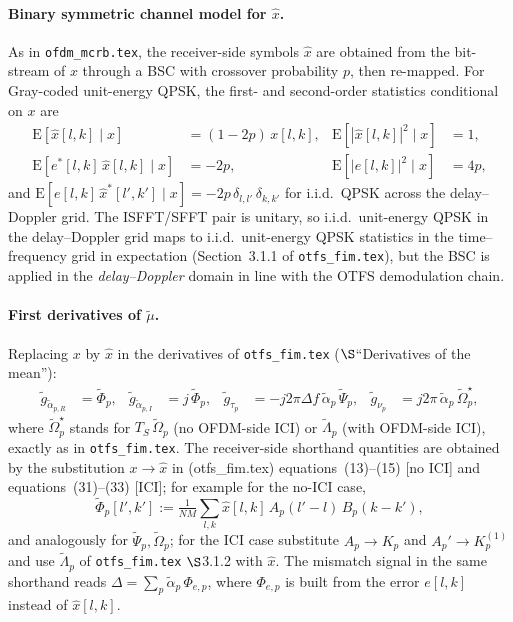 \documentclass[11pt]{article}
\begin{document}
\paragraph{Binary symmetric channel model for \(\hat{x}\).} As in \texttt{ofdm\_mcrb.tex}, the receiver-side symbols \(\hat{x}\) are obtained from the bit-stream of \(x\) through a BSC with crossover probability \(p\), then re-mapped. For Gray-coded unit-energy QPSK, the first- and second-order statistics conditional on \(x\) are
\begin{align}
    \mathrm{E}[\hat{x}[l,k] \mid x] &= (1-2p)\, x[l,k], &
    \mathrm{E}[|\hat{x}[l,k]|^2 \mid x] &= 1, \\
    \mathrm{E}[e^*[l,k]\, \hat{x}[l,k] \mid x] &= -2p, &
    \mathrm{E}[|e[l,k]|^2 \mid x] &= 4p,
\end{align}
and \(\mathrm{E}[e[l,k]\, \hat{x}^*[l',k'] \mid x] = -2p\, \delta_{l,l'}\, \delta_{k,k'}\) for i.i.d.\ QPSK across the delay--Doppler grid. The ISFFT/SFFT pair is unitary, so i.i.d.\ unit-energy QPSK in the delay--Doppler grid maps to i.i.d.\ unit-energy QPSK statistics in the time--frequency grid in expectation (Section~3.1.1 of \texttt{otfs\_fim.tex}), but the BSC is applied in the \emph{delay--Doppler} domain in line with the OTFS demodulation chain.

\paragraph{First derivatives of \(\tilde{\mu}\).} Replacing \(x\) by \(\hat{x}\) in the derivatives of \texttt{otfs\_fim.tex} (\(\S\)``Derivatives of the mean''):
\begin{align}
    \tilde{g}_{\tilde{\alpha}_{p,R}} &= \tilde{\Phi}_p, &
    \tilde{g}_{\tilde{\alpha}_{p,I}} &= j\, \tilde{\Phi}_p, &
    \tilde{g}_{\tau_p} &= -j2\pi\Delta f\, \tilde{\alpha}_p\, \tilde{\Psi}_p, &
    \tilde{g}_{\nu_p} &= j2\pi\, \tilde{\alpha}_p\, \tilde{\Omega}_p^{\!\star},
\end{align}
where \(\tilde{\Omega}_p^{\!\star}\) stands for \(T_S\, \tilde{\Omega}_p\) (no OFDM-side ICI) or \(\tilde{\Lambda}_p\) (with OFDM-side ICI), exactly as in \texttt{otfs\_fim.tex}. The receiver-side shorthand quantities are obtained by the substitution \(x \to \hat{x}\) in (otfs\_fim.tex) equations~(13)--(15) [no ICI] and equations~(31)--(33) [ICI]; for example for the no-ICI case,
\begin{equation}
    \tilde{\Phi}_p[l',k'] := \tfrac{1}{NM}\sum_{l,k} \hat{x}[l,k]\, A_p(l'-l)\, B_p(k-k'),
\end{equation}
and analogously for \(\tilde{\Psi}_p, \tilde{\Omega}_p\); for the ICI case substitute \(A_p \to K_p\) and \(A_p' \to K_p^{(1)}\) and use \(\tilde{\Lambda}_p\) of \texttt{otfs\_fim.tex} \(\S\)3.1.2 with \(\hat{x}\). The mismatch signal in the same shorthand reads \(\Delta = \sum_p \tilde{\alpha}_p\, \Phi_{e,p}\), where \(\Phi_{e,p}\) is built from the error \(e[l,k]\) instead of \(\hat{x}[l,k]\).
\end{document}
